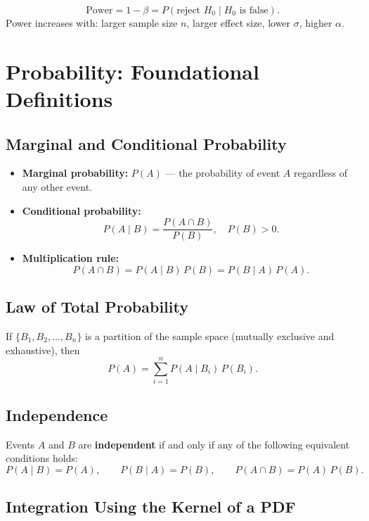 \documentclass[11pt, a4paper]{article}
\begin{document}
\[
  \text{Power} = 1 - \beta = P(\text{reject } H_0 \mid H_0 \text{ is false}).
\]
Power increases with: larger sample size $n$, larger effect size, lower $\sigma$, higher $\alpha$.

\section{Probability: Foundational Definitions}

\subsection{Marginal and Conditional Probability}

\begin{itemize}
  \item \textbf{Marginal probability:} $P(A)$ --- the probability of event $A$ regardless of any other event.
  \item \textbf{Conditional probability:}
  \[
    P(A \mid B) = \frac{P(A \cap B)}{P(B)}, \quad P(B) > 0.
  \]
  \item \textbf{Multiplication rule:}
  \[
    P(A \cap B) = P(A \mid B)\,P(B) = P(B \mid A)\,P(A).
  \]
\end{itemize}

\subsection{Law of Total Probability}

If $\{B_1, B_2, \ldots, B_n\}$ is a partition of the sample space (mutually exclusive and exhaustive), then
\[
  P(A) = \sum_{i=1}^{n} P(A \mid B_i)\,P(B_i).
\]

\subsection{Independence}

Events $A$ and $B$ are \textbf{independent} if and only if any of the following equivalent conditions holds:
\[
  P(A \mid B) = P(A), \qquad P(B \mid A) = P(B), \qquad P(A \cap B) = P(A)\,P(B).
\]

\subsection{Integration Using the Kernel of a PDF}
\end{document}
